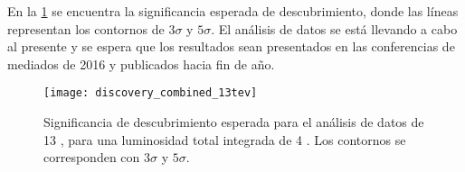 En la \cref{fig:13tev_discovery} se encuentra la significancia esperada de descubrimiento,
donde las líneas representan los contornos de $3\sigma$ y $5\sigma$.
El análisis de datos se está llevando a cabo al presente y se espera que los resultados
sean presentados en las conferencias de mediados de 2016 y publicados hacia fin de a\~no.

\begin{figure}[!htb]
  \centering

  \texttt{[image: discovery\_combined\_13tev]}

  \caption{Significancia de descubrimiento esperada para el análisis de datos de 13 \tev,
    para una luminosidad total integrada de 4 \ifb. Los contornos se corresponden con $3\sigma$ y $5\sigma$.}
  \label{fig:13tev_discovery}

\end{figure}
